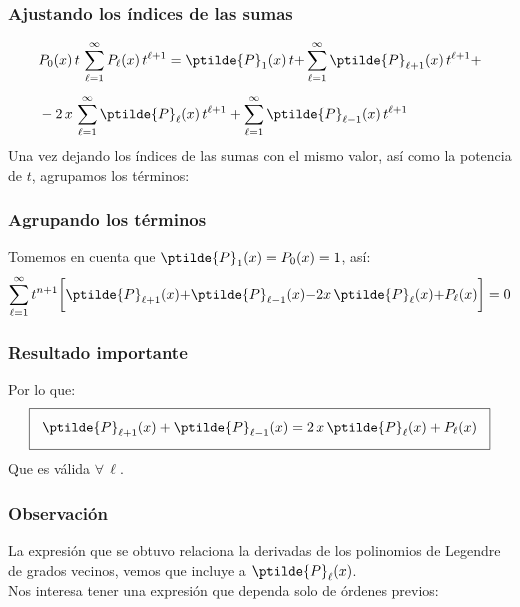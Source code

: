 \begin{frame}
\frametitle{Ajustando los índices de las sumas}
\begin{align*}
&P_{0}(x) \, t \, \sum_{\ell=1}^{\infty} P_{\ell} (x) \, t^{\ell+1} = \ptilde{P}_{1} (x) \, t {+} \sum_{\ell=1}^{\infty} \ptilde{P}_{\ell+1} (x) \, t^{\ell+1} + \\[0.5em]
&- 2 \, x \, \sum_{\ell=1}^{\infty} \ptilde{P}_{\ell} (x) \, t^{\ell+1} + \sum_{\ell=1}^{\infty} \ptilde{P}_{\ell-1} (x) \, t^{\ell+1}
\end{align*}
\pause
Una vez dejando los índices de las sumas con el mismo valor, así como la potencia de $t$, agrupamos los términos:
\end{frame}
\begin{frame}
\frametitle{Agrupando los términos}
Tomemos en cuenta que $\ptilde{P}_{1}(x) = P_{0}(x) = 1$, así:
\pause
\begin{align*}
\sum_{\ell=1}^{\infty} t^{n+1} \bigg[ \ptilde{P}_{\ell+1} (x) {+} \ptilde{P}_{\ell-1} (x) {-} 2 x \, \ptilde{P}_{\ell} (x) {+} P_{\ell} (x) \bigg] = 0
\end{align*}
\end{frame}
\begin{frame}
\frametitle{Resultado importante}
Por lo que:
\begin{align*}
\setlength{\fboxsep}{3\fboxsep}\boxed{
\ptilde{P}_{\ell+1} (x) + \ptilde{P}_{\ell-1} (x) = 2 \, x \, \ptilde{P}_{\ell} (x) + P_{\ell} (x)
}
\end{align*}
\pause
Que es válida $\forall \, \ell$.
\end{frame}
\begin{frame}
\frametitle{Observación}
La expresión que se obtuvo relaciona la derivadas de los polinomios de Legendre de grados vecinos, vemos que incluye a $\ptilde{P}_{\ell}(x)$.
\\
\bigskip
\pause
Nos interesa tener una expresión que dependa solo de órdenes previos:
\end{frame}
